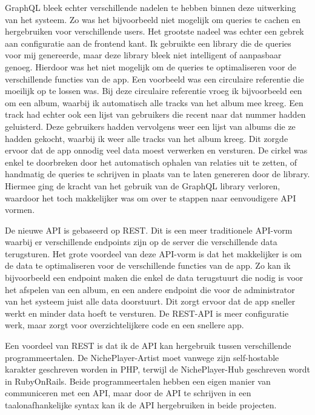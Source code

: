 GraphQL bleek echter verschillende nadelen te hebben binnen deze uitwerking van het systeem. Zo was het bijvoorbeeld niet mogelijk om queries te cachen en hergebruiken voor verschillende users. Het grootste nadeel was echter een gebrek aan configuratie aan de frontend kant. Ik gebruikte een library die de queries voor mij genereerde, maar deze library bleek niet intelligent of aanpasbaar genoeg. Hierdoor was het niet mogelijk om de queries te optimaliseren voor de verschillende functies van de app. Een voorbeeld was een circulaire referentie die moeilijk op te lossen was. Bij deze circulaire referentie vroeg ik bijvoorbeeld een om een album, waarbij ik automatisch alle tracks van het album mee kreeg. Een track had echter ook een lijst van gebruikers die recent naar dat nummer hadden geluisterd. Deze gebruikers hadden vervolgens weer een lijst van albums die ze hadden gekocht, waarbij ik weer alle tracks van het album kreeg. Dit zorgde ervoor dat de app onnodig veel data moest verwerken en versturen. De cirkel was enkel te doorbreken door het automatisch ophalen van relaties uit te zetten, of handmatig de queries te schrijven in plaats van te laten genereren door de library. Hiermee ging de kracht van het gebruik van de GraphQL library verloren, waardoor het toch makkelijker was om over te stappen naar eenvoudigere API vormen.

De nieuwe API is gebaseerd op REST. Dit is een meer traditionele API-vorm waarbij er verschillende endpoints zijn op de server die verschillende data terugsturen. Het grote voordeel van deze API-vorm is dat het makkelijker is om de data te optimaliseren voor de verschillende functies van de app. Zo kan ik bijvoorbeeld een endpoint maken die enkel de data terugstuurt die nodig is voor het afspelen van een album, en een andere endpoint die voor de administrator van het systeem juist alle data doorstuurt. Dit zorgt ervoor dat de app sneller werkt en minder data hoeft te versturen. De REST-API is meer configuratie werk, maar zorgt voor overzichtelijkere code en een snellere app.

Een voordeel van REST is dat ik de API kan hergebruik tussen verschillende programmeertalen. De NichePlayer-Artist moet vanwege zijn self-hostable karakter geschreven worden in PHP, terwijl de NichePlayer-Hub geschreven wordt in RubyOnRails. Beide programmeertalen hebben een eigen manier van communiceren met een API, maar door de API te schrijven in een taalonafhankelijke syntax kan ik de API hergebruiken in beide projecten.

